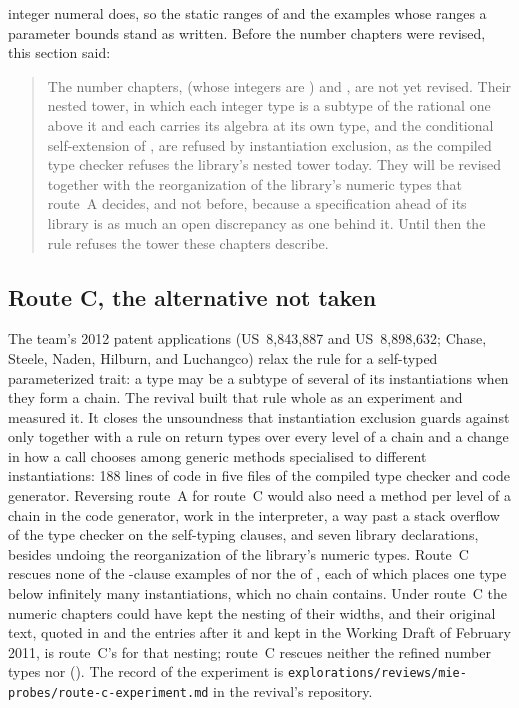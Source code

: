 integer numeral does, so the static ranges of  and the examples
whose ranges a  parameter bounds stand as written.
Before the number chapters were revised, this section said:
\begin{quote}
The number chapters,  (whose integers are )
and , are not yet revised.
Their nested tower, in which each integer type is a subtype of the rational
one above it and each carries its algebra at its own type, and the
conditional self-extension of , are refused by
instantiation exclusion, as the compiled type checker refuses the
library's nested tower today.
They will be revised together with the reorganization of the library's
numeric types that route~A decides, and not before, because a
specification ahead of its library is as much an open discrepancy as one
behind it.
Until then the rule refuses the tower these chapters describe.
\end{quote}

\subsection{Route C, the alternative not taken}

The team's 2012 patent applications (US~8,843,887 and US~8,898,632;
Chase, Steele, Naden, Hilburn, and Luchangco) relax the rule for a
self-typed parameterized trait: a type may be a subtype of several of its
instantiations when they form a chain.
The revival built that rule whole as an experiment and measured it.
It closes the unsoundness that instantiation exclusion guards against only
together with a rule on return types over every level of a chain and a
change in how a call chooses among generic methods specialised to
different instantiations: 188 lines of code in five files of the compiled
type checker and code generator.
Reversing route~A for route~C would also need a method per level of a
chain in the code generator, work in the interpreter, a way past a stack
overflow of the type checker on the self-typing clauses, and seven library
declarations, besides undoing the reorganization of the library's numeric
types.
Route~C rescues none of the -clause examples of
 nor the  of ,
each of which places one type below infinitely many instantiations, which
no chain contains.
Under route~C the numeric chapters could have kept the nesting of their
widths, and their original text, quoted in  and the
entries after it and kept in the Working Draft of February 2011, is route~C's
for that nesting; route~C rescues neither the refined number types nor
 ().
The record of the experiment is
\nolinkurl{explorations/reviews/mie-probes/route-c-experiment.md} in the
revival's repository.
\fussy
